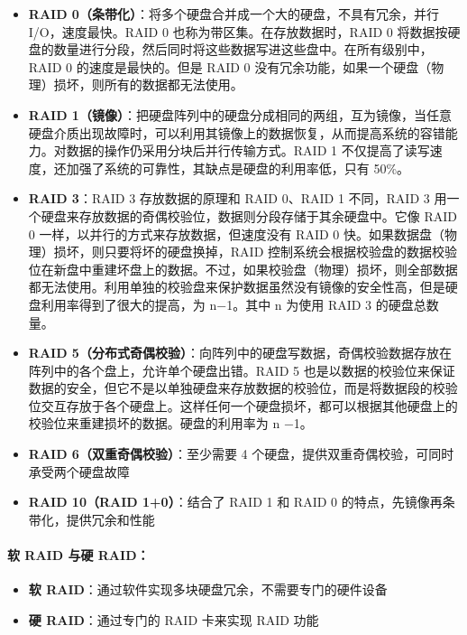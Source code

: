 \documentclass[12pt,UTF8]{ctexbook}
\begin{document}
\begin{itemize}
    \item \textbf{RAID 0（条带化）}：将多个硬盘合并成一个大的硬盘，不具有冗余，并行 I/O，速度最快。RAID 0 也称为带区集。在存放数据时，RAID 0 将数据按硬盘的数量进行分段，然后同时将这些数据写进这些盘中。在所有级别中，RAID 0 的速度是最快的。但是 RAID 0 没有冗余功能，如果一个硬盘（物理）损坏，则所有的数据都无法使用。
    \item \textbf{RAID 1（镜像）}：把硬盘阵列中的硬盘分成相同的两组，互为镜像，当任意硬盘介质出现故障时，可以利用其镜像上的数据恢复，从而提高系统的容错能力。对数据的操作仍采用分块后并行传输方式。RAID 1 不仅提高了读写速度，还加强了系统的可靠性，其缺点是硬盘的利用率低，只有 50\%。
    \item \textbf{RAID 3}：RAID 3 存放数据的原理和 RAID 0、RAID 1 不同，RAID 3 用一个硬盘来存放数据的奇偶校验位，数据则分段存储于其余硬盘中。它像 RAID 0 一样，以并行的方式来存放数据，但速度没有 RAID 0 快。如果数据盘（物理）损坏，则只要将坏的硬盘换掉，RAID 控制系统会根据校验盘的数据校验位在新盘中重建坏盘上的数据。不过，如果校验盘（物理）损坏，则全部数据都无法使用。利用单独的校验盘来保护数据虽然没有镜像的安全性高，但是硬盘利用率得到了很大的提高，为 n−1。其中 n 为使用 RAID 3 的硬盘总数量。
    \item \textbf{RAID 5（分布式奇偶校验）}：向阵列中的硬盘写数据，奇偶校验数据存放在阵列中的各个盘上，允许单个硬盘出错。RAID 5 也是以数据的校验位来保证数据的安全，但它不是以单独硬盘来存放数据的校验位，而是将数据段的校验位交互存放于各个硬盘上。这样任何一个硬盘损坏，都可以根据其他硬盘上的校验位来重建损坏的数据。硬盘的利用率为 n −1。
    \item \textbf{RAID 6（双重奇偶校验）}：至少需要 4 个硬盘，提供双重奇偶校验，可同时承受两个硬盘故障
    \item \textbf{RAID 10（RAID 1+0）}：结合了 RAID 1 和 RAID 0 的特点，先镜像再条带化，提供冗余和性能
\end{itemize}

\paragraph{软 RAID 与硬 RAID：}
\begin{itemize}
    \item \textbf{软 RAID}：通过软件实现多块硬盘冗余，不需要专门的硬件设备
    \item \textbf{硬 RAID}：通过专门的 RAID 卡来实现 RAID 功能
\end{itemize}
\end{document}

